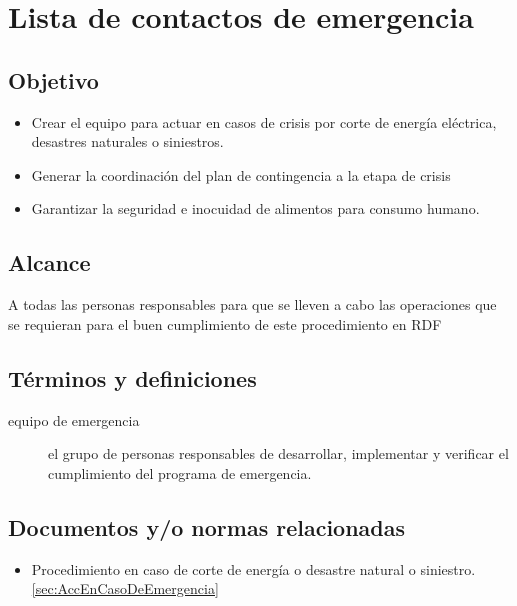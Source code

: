 \thispagestyle{formato-PI}
\renewcommand{\MayorVer}{2}
\renewcommand{\MenorVer}{0}
\renewcommand{\Codigo}{PSA-1-PROG} %
\renewcommand{\FechaPub}{2023--01}
\renewcommand{\Titulo}{Lista de contactos de emergencia}

\section{\Titulo}


\subsection{Objetivo}
\begin{itemize}
	\item Crear el equipo para actuar en casos de crisis por corte de energía eléctrica, desastres naturales o siniestros.
	\item Generar la coordinación del plan de contingencia a la etapa de crisis
	\item Garantizar la seguridad e inocuidad de alimentos para consumo humano.
\end{itemize}

\subsection{Alcance}
A todas las personas responsables para que se lleven a cabo las operaciones que se requieran para el buen cumplimiento de este procedimiento en \gls{RDF}

\subsection{Términos y definiciones}

\begin{description}
	\item[equipo de emergencia] el grupo de personas responsables de desarrollar, implementar y verificar el cumplimiento del programa de emergencia.
\end{description}

\subsection{Documentos y/o normas relacionadas}
\begin{itemize}
	\item Procedimiento en caso de corte de energía o desastre natural o siniestro. \cref{sec:AccEnCasoDeEmergencia}
\end{itemize}


